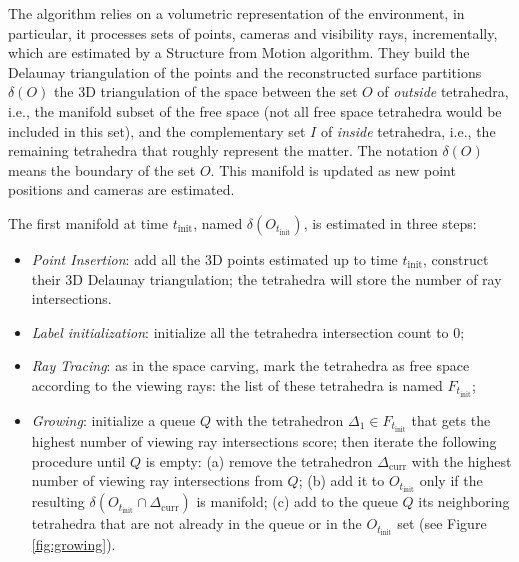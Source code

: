 The algorithm relies on a volumetric representation of the environment, in particular, it processes sets of points, cameras and visibility rays, incrementally, which are estimated by a Structure from Motion algorithm. 
They build the Delaunay triangulation of the points and the reconstructed surface partitions $\delta( O)$ the 3D triangulation of the space between the set $O$ of \emph{outside} tetrahedra, i.e., the manifold subset of the free space (not all free space tetrahedra would be included in this set), and the complementary set $I$ of \emph{inside} tetrahedra, i.e., the remaining tetrahedra that roughly represent the matter. The notation $\delta( O)$ means the boundary  of the set $O$.
This manifold is updated as new point positions and cameras are estimated. 

The first manifold at time $t_{\text{init}}$,  named $\delta( O_{t_{\text{init}}})$, is estimated in three steps:
\begin{itemize}
  \item \emph{Point Insertion}: add all the 3D points estimated up to time $t_{\text{init}}$, construct their 3D Delaunay triangulation; the tetrahedra will store the number of ray intersections.
  \item \emph{Label initialization}: initialize all the tetrahedra intersection count to $0$;
  \item \emph{Ray Tracing}: as in the space carving, mark the tetrahedra as free space according to the viewing rays: the list of these tetrahedra is named $F_{t_{\text{init}}}$;
  \item \emph{Growing}: initialize a queue $Q$ with the tetrahedron $\Delta_1 \in F_{t_{\text{init}}}$ that gets the highest number of viewing ray intersections score; then iterate the following procedure until $Q$ is empty: (a) remove the tetrahedron $\Delta_{\text{curr}}$ with the highest number of viewing ray intersections from $Q$; (b) add it to $O_{t_{\text{init}}}$ only if the resulting $\delta (O_{t_{\text{init}}} \cap \Delta_{\text{curr}})$  is manifold; (c) add to the queue $Q$ its neighboring tetrahedra that are not already in the queue or in the $O_{t_{\text{init}}}$ set (see Figure \ref{fig:growing}). 
\end{itemize}


